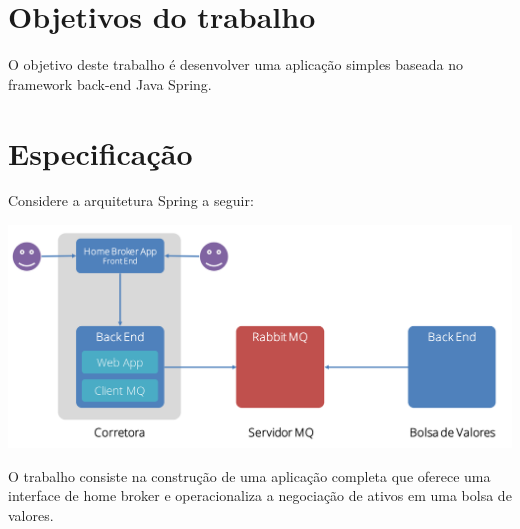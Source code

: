 \documentclass[12pt,brazil, a4paper, fullpage]{article}
\begin{document}
    \lstset{language=Java,
        basicstyle=\small, %
        showstringspaces=false}

\thispagestyle{plain}





\section{Objetivos do trabalho}

O objetivo deste trabalho é desenvolver uma aplicação simples baseada no framework back-end Java Spring.

\section{Especificação}

\indent \indent Considere a arquitetura Spring a seguir:

\includegraphics[width=\textwidth]{mvc-architecture.png}


O trabalho consiste na construção de uma aplicação completa que oferece uma interface de home broker e operacionaliza a negociação de ativos em uma bolsa de valores.
\end{document}
